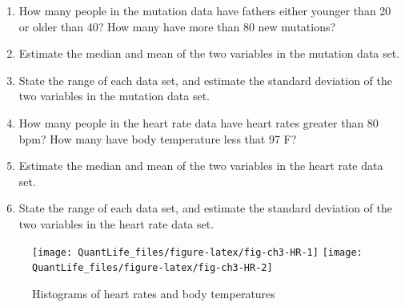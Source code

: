 \documentclass[
]{book}
\newenvironment{Shaded}{\begin{snugshade}}{\end{snugshade}}
\newcommand{\DataTypeTok}[1]{\textcolor[rgb]{0.13,0.29,0.53}{#1}}
\newcommand{\KeywordTok}[1]{\textcolor[rgb]{0.13,0.29,0.53}{\textbf{#1}}}
\newcommand{\NormalTok}[1]{#1}
\newcommand{\OperatorTok}[1]{\textcolor[rgb]{0.81,0.36,0.00}{\textbf{#1}}}
\newcommand{\OtherTok}[1]{\textcolor[rgb]{0.56,0.35,0.01}{#1}}
\newcommand{\StringTok}[1]{\textcolor[rgb]{0.31,0.60,0.02}{#1}}
\theoremstyle{definition}
\theoremstyle{definition}
\theoremstyle{definition}
\theoremstyle{remark}
\begin{document}
\begin{enumerate}
\def\labelenumi{\arabic{enumi}.}
\item
  How many people in the mutation data have fathers either younger than 20 or older than 40? How many have more than 80 new mutations? 
\item
  Estimate the median and mean of the two variables in the mutation data set.
\item
  State the range of each data set, and estimate the standard deviation of the two variables in the mutation data set.
\item
  How many people in the heart rate data have heart rates greater than 80 bpm? How many have body temperature less that 97 F?
\item
  Estimate the median and mean of the two variables in the heart rate data set.
\item
  State the range of each data set, and estimate the standard deviation of the two variables in the heart rate data set.
\end{enumerate}

\begin{Shaded}
\end{Shaded}

\begin{figure}

{\centering \texttt{[image: QuantLife\_files/figure-latex/fig-ch3-HR-1]} \texttt{[image: QuantLife\_files/figure-latex/fig-ch3-HR-2]} 

}

\caption{Histograms of heart rates and body temperatures}\label{fig:fig-ch3-HR}
\end{figure}
\end{document}
